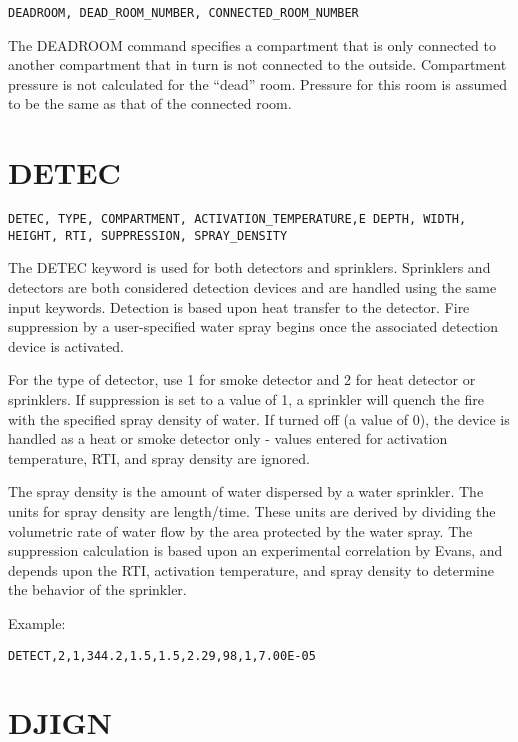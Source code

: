 \begin{lstlisting}
DEADROOM, DEAD_ROOM_NUMBER, CONNECTED_ROOM_NUMBER
\end{lstlisting}
The DEADROOM command specifies a compartment that is only connected to another compartment that in turn is not connected to the outside.  Compartment pressure is not calculated for the ``dead'' room. Pressure for this room is assumed to be the same as that of the connected room.

\section{DETEC}

\begin{lstlisting}
DETEC, TYPE, COMPARTMENT, ACTIVATION_TEMPERATURE,E DEPTH, WIDTH, HEIGHT, RTI, SUPPRESSION, SPRAY_DENSITY
\end{lstlisting}
The DETEC keyword is used for both detectors and sprinklers. Sprinklers and detectors are both considered detection devices and are handled using the same input keywords.  Detection is based upon heat transfer to the detector. Fire suppression by a user-specified water spray begins once the associated detection device is activated.

For the type of detector, use 1 for smoke detector and 2 for heat detector or sprinklers. If suppression is set to a value of 1, a sprinkler will quench the fire with the specified spray density of water. If turned off (a value of 0), the device is handled as a heat or smoke detector only - values entered for activation temperature, RTI, and spray density are ignored.

The spray density is the amount of water dispersed by a water sprinkler.  The units for spray density are length/time.  These units are derived by dividing the volumetric rate of water flow by the area protected by the water spray. The suppression calculation is based upon an experimental correlation by Evans, and depends upon the RTI, activation temperature, and spray density to determine the behavior of the sprinkler.

Example:

\begin{lstlisting}
DETECT,2,1,344.2,1.5,1.5,2.29,98,1,7.00E-05
\end{lstlisting}

\section{DJIGN}

